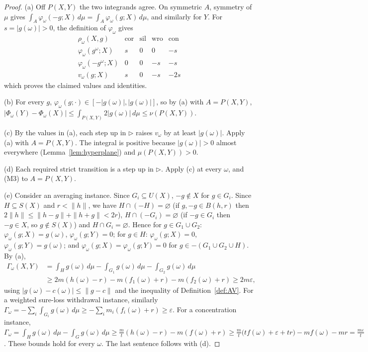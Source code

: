 \documentclass[11pt]{article}
\theoremstyle{definition}
\newcommand{\cor}{\mathrm{cor}}
\newcommand{\sil}{\mathrm{sil}}
\newcommand{\wro}{\mathrm{wro}}
\newcommand{\con}{\mathrm{con}}
\begin{document}
\begin{proof}
(a) Off $P(X,Y)$ the two integrands agree. On symmetric $A$, symmetry of $\mu$ gives $\int_A\varphi_\omega(-g;X)\,d\mu=\int_A\varphi_\omega(g;X)\,d\mu$, and similarly for $Y$. For $s=|g(\omega)|>0$, the definition of $\varphi_\omega$ gives
\[
\begin{array}{c|rrrr}
\rho_\omega(X,g)&\cor&\sil&\wro&\con\\\hline
\varphi_\omega(g^\omega;X)&s&0&0&-s\\
\varphi_\omega(-g^\omega;X)&0&0&-s&-s\\
v_\omega(g;X)&s&0&-s&-2s
\end{array}
\]
which proves the claimed values and identities.

(b) For every $g$, $\varphi_\omega(g;\cdot)\in[-|g(\omega)|,|g(\omega)|]$, so by (a) with $A=P(X,Y)$, $|\Phi_\omega(Y)-\Phi_\omega(X)|\le\int_{P(X,Y)}2|g(\omega)|\,d\mu\le\nu(P(X,Y))$.

(c) By the values in (a), each step up in $\rhd$ raises $v_\omega$ by at least $|g(\omega)|$. Apply (a) with $A=P(X,Y)$. The integral is positive because $|g(\omega)|>0$ almost everywhere (Lemma~\ref{lem:hyperplane}) and $\mu(P(X,Y))>0$.

(d) Each required strict transition is a step up in $\rhd$. Apply (c) at every $\omega$, and (M3) to $A=P(X,Y)$.

(e) Consider an averaging instance. Since $G_i\subseteq U(X)$, $-g\notin X$ for $g\in G_i$. Since $H\subseteq S(X)$ and $r<\|h\|$, we have $H\cap(-H)=\varnothing$ (if $g,-g\in B(h,r)$ then $2\|h\|\le\|h-g\|+\|h+g\|<2r$), $H\cap(-G_i)=\varnothing$ (if $-g\in G_i$ then $-g\in X$, so $g\notin S(X)$) and $H\cap G_i=\varnothing$. Hence for $g\in G_1\cup G_2$: $\varphi_\omega(g;X)=g(\omega)$, $\varphi_\omega(g;Y)=0$; for $g\in H$: $\varphi_\omega(g;X)=0$, $\varphi_\omega(g;Y)=g(\omega)$; and $\varphi_\omega(g;X)=\varphi_\omega(g;Y)=0$ for $g\in-(G_1\cup G_2\cup H)$. By (a),
\begin{align*}
\Gamma_\omega(X,Y)&=\int_Hg(\omega)\,d\mu-\int_{G_1}g(\omega)\,d\mu-\int_{G_2}g(\omega)\,d\mu\\
&\ge2m(h(\omega)-r)-m(f_1(\omega)+r)-m(f_2(\omega)+r)\ge2m\varepsilon,
\end{align*}
using $|g(\omega)-c(\omega)|\le\|g-c\|$ and the inequality of Definition~\ref{def:AV}. For a weighted sure-loss withdrawal instance, similarly $\Gamma_\omega=-\sum_i\int_{G_i}g(\omega)\,d\mu\ge-\sum_im_i(f_i(\omega)+r)\ge\varepsilon$. For a concentration instance, $\Gamma_\omega=\int_Hg(\omega)\,d\mu-\int_Gg(\omega)\,d\mu\ge\frac mt(h(\omega)-r)-m(f(\omega)+r)\ge\frac mt\bigl(tf(\omega)+\varepsilon+tr\bigr)-mf(\omega)-mr=\frac{m\varepsilon}t$. These bounds hold for every $\omega$. The last sentence follows with (d).
\end{proof}
\end{document}
